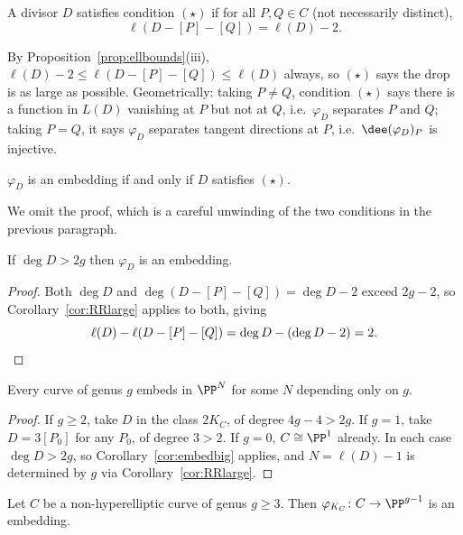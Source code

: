 \begin{definition}
	A divisor $D$ satisfies condition $(\star)$ if for all $P,Q \in C$ (not necessarily distinct),
	$$\ell(D - [P] - [Q]) = \ell(D) - 2.$$
\end{definition}

By Proposition~\ref{prop:ellbounds}(iii), $\ell(D)-2 \leq \ell(D-[P]-[Q]) \leq \ell(D)$ always, so $(\star)$ says the drop is as large as possible. Geometrically: taking $P \neq Q$, condition $(\star)$ says there is a function in $L(D)$ vanishing at $P$ but not at $Q$, i.e.\ $\varphi_D$ separates $P$ and $Q$; taking $P = Q$, it says $\varphi_D$ separates tangent directions at $P$, i.e.\ $\dee(\varphi_D)_P$ is injective.

\begin{theorem}\label{thm:embedding}
	$\varphi_D$ is an embedding if and only if $D$ satisfies $(\star)$.
\end{theorem}

We omit the proof, which is a careful unwinding of the two conditions in the previous paragraph.

\begin{corollary}\label{cor:embedbig}
	If $\deg D > 2g$ then $\varphi_D$ is an embedding.
\end{corollary}

\begin{proof}
	Both $\deg D$ and $\deg(D-[P]-[Q]) = \deg D - 2$ exceed $2g-2$, so Corollary~\ref{cor:RRlarge} applies to both, giving
	$$\ell(D) - \ell(D-[P]-[Q]) = \deg D - (\deg D - 2) = 2. \qedhere$$
\end{proof}

\begin{corollary}
	Every curve of genus $g$ embeds in $\PP^N$ for some $N$ depending only on $g$.
\end{corollary}

\begin{proof}
	If $g \geq 2$, take $D$ in the class $2K_C$, of degree $4g-4 > 2g$. If $g = 1$, take $D = 3[P_0]$ for any $P_0$, of degree $3 > 2$. If $g = 0$, $C \cong \PP^1$ already. In each case $\deg D > 2g$, so Corollary~\ref{cor:embedbig} applies, and $N = \ell(D)-1$ is determined by $g$ via Corollary~\ref{cor:RRlarge}.
\end{proof}

\begin{theorem}
	Let $C$ be a non-hyperelliptic curve of genus $g \geq 3$. Then $\varphi_{K_C} \colon C \to \PP^{g-1}$ is an embedding.
\end{theorem}

